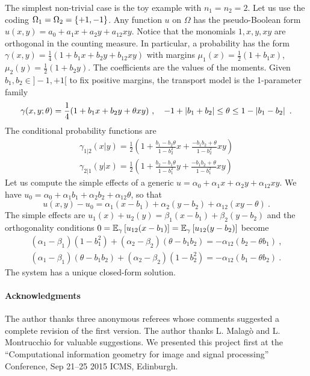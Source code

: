 \documentclass[runningheads]{llncs}
\begin{document}
\begin{remark}
  The simplest non-trivial case is the toy example with $n_1=n_2=2$. Let us use the coding $\Omega_1=\Omega_2=\left\{ +1,-1 \right\}$. Any function $u$ on $\Omega$ has the pseudo-Boolean form $u(x,y)=a_0+a_1 x + a_2 y + a_{12} xy$. Notice that the monomials $1,x,y,xy$ are orthogonal in the counting measure. In particular, a probability has the form $\gamma(x,y) = \frac14(1+b_1x+b_2y+b_{12}xy)$ with margins $\mu_1(x) = \frac12(1+b_1x)$, $\mu_2(y) = \frac12(1+b_2y)$. The coefficients are the values of the moments. Given $b_1, b_2 \in ]-1,+1[$ to fix positive margins, the transport model is the 1-parameter family
\begin{equation*} \gamma(x,y;\theta) = \frac14(1+ b_1x+ b_2y+\theta xy)\ , \quad -1 + \left| b_1+b_2 \right| \leq \theta \leq 1 - \left| b_1 - b_2 \right| \ . \end{equation*}
The conditional probability functions are
\begin{gather*} \gamma_{1|2}(x|y) = \frac12 \left(1+\frac{b_1-b_2\theta}{1-b_2^2}x+\frac{-b_1b_2 + \theta}{1-b_2^2}xy\right) \\ \gamma_{2|1}(y|x) = \frac12 \left(1+\frac{b_2-b_1\theta}{1-b_1^2}y+\frac{-b_1b_2 + \theta}{1-b_1^2}xy\right) \end{gather*}
Let us compute the simple effects of a generic $u = \alpha_0 + \alpha_1 x + \alpha_2 y + \alpha_{12} xy$. We have $u_0 = \alpha_0 + \alpha_1 b_1 + \alpha_2 b_2 + \alpha_{12} \theta$, so that
\begin{equation*}
  u(x,y) - u_0 = \alpha_1 (x - b_1) + \alpha_2(y-b_2) + \alpha_{12} (xy - \theta) \ .
\end{equation*}
The simple effects are $u_1(x) + u_2(y) = \beta_1 (x - b_1) + \beta_2(y-b_2)$ and the orthogonality conditions $0 = {\operatorname{\mathbb E}}_{\gamma}\left[u_{12}(x - b_1)\right] = {\operatorname{\mathbb E}}_{\gamma}\left[u_{12}(y-b_2)\right]$ become
\begin{gather*}
  (\alpha_1-\beta_1)(1-b_1^2)+(\alpha_2-\beta_2)(\theta-b_1b_2) = - \alpha_{12}(b_2-\theta b_1) \ , \\
  (\alpha_1-\beta_1)(\theta-b_1b_2)+(\alpha_2-\beta_2)(1 - b_2^2)= - \alpha_{12}(b_1-\theta b_2) \ . 
\end{gather*}
The system has a unique closed-form solution. 
\end{remark}

\paragraph{Acknowledgments}
The author thanks three anonymous referees whose comments suggested a complete revision of the first version. The author thanks L. Malag\`o and L. Montrucchio for valuable suggestions. We presented this project first at the ``Computational information geometry for image and signal processing'' Conference, Sep 21--25 2015 ICMS, Edinburgh.

%


%
\end{document}
